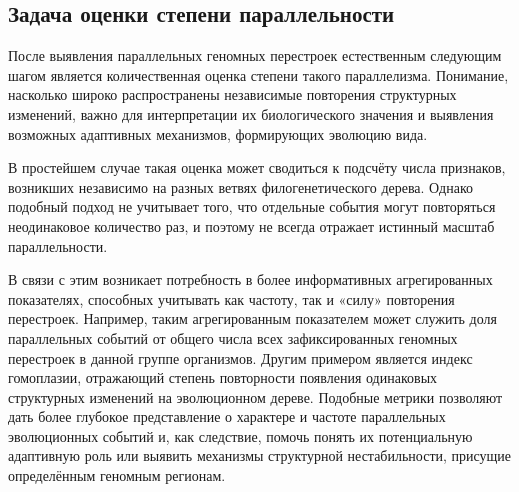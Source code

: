 \subsection{Задача оценки степени параллельности}
\label{subsec:parallelism_estimation}

После выявления параллельных геномных перестроек естественным следующим шагом является количественная оценка степени такого параллелизма.
Понимание, насколько широко распространены независимые повторения структурных изменений, важно для интерпретации их биологического значения и выявления возможных адаптивных механизмов, формирующих эволюцию вида.

В простейшем случае такая оценка может сводиться к подсчёту числа признаков, возникших независимо на разных ветвях филогенетического дерева.
Однако подобный подход не учитывает того, что отдельные события могут повторяться неодинаковое количество раз, и поэтому не всегда отражает истинный масштаб параллельности. 

В связи с этим возникает потребность в более информативных агрегированных показателях, способных учитывать как частоту, так и «силу» повторения перестроек.
Например, таким агрегированным показателем может служить доля параллельных событий от общего числа всех зафиксированных геномных перестроек в данной группе организмов.
Другим примером является индекс гомоплазии, отражающий степень повторности появления одинаковых структурных изменений на эволюционном дереве.
Подобные метрики позволяют дать более глубокое представление о характере и частоте параллельных эволюционных событий и, как следствие, помочь понять их потенциальную адаптивную роль или выявить механизмы структурной нестабильности, присущие определённым геномным регионам.
